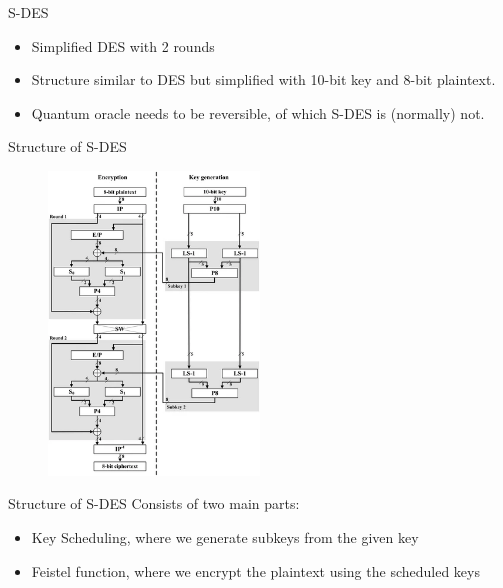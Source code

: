 \documentclass{beamer}
\begin{document}
    \begin{frame}{S-DES}
        \begin{itemize}
            \item Simplified DES with 2 rounds
            \item Structure similar to DES but simplified with 10-bit key and 8-bit plaintext.
            \item Quantum oracle needs to be reversible, of which S-DES is (normally) not.
        \end{itemize}
    \end{frame}

    \begin{frame}{Structure of S-DES}
        \begin{figure}[h]
            \centering
            \includegraphics[width=0.5\textwidth]{./Images/sdes.png}
        \end{figure}
    \end{frame}

    \begin{frame}{Structure of S-DES}
        Consists of two main parts:
        \begin{itemize}
            \item Key Scheduling, where we generate subkeys from the given key
            \item Feistel function, where we encrypt the plaintext using the scheduled keys
        \end{itemize}
    \end{frame}
\end{document}
